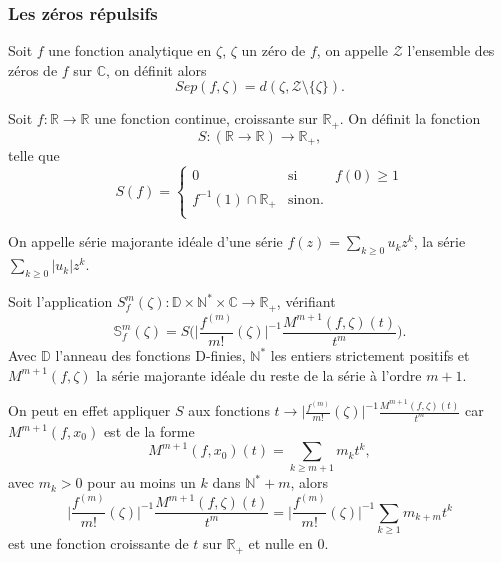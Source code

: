 \documentclass[a4paper,10pt]{article}
\begin{document}
	\subsubsection{Les zéros répulsifs}
	
	\begin{definition}
		Soit $f$ une fonction analytique en $\zeta$, $\zeta$ un zéro de $f$, on appelle $\mathcal{Z}$ l'ensemble des zéros de $f$ sur $\mathbb{C}$, on définit alors
		 \[Sep(f,\zeta)= d(\zeta, \mathcal{Z}\setminus\{\zeta\}).\]
	\end{definition}
	\begin{definition} Soit $f:\mathbb{R}\rightarrow\mathbb{R}$ une fonction continue, croissante sur $\mathbb{R}_+$. On définit la fonction \[S:(\mathbb{R} \rightarrow \mathbb{R}) \longrightarrow \mathbb{R}_+,\] 
	telle que
		\begin{equation}
		S(f)=
		\left\lbrace
		\begin{array}{ccc}
		0  & \mbox{si} & f(0) \geq 1\\
		f^{-1}(1)\cap \mathbb{R}_{+} & \mbox{sinon}.\\
		\end{array}\right.
		\end{equation}
	\end{definition}
	\begin{definition}
		On appelle série majorante idéale d'une série $f(z)=\sum_{k\geq0}u_kz^k$, la série $\sum_{k\geq0}|u_k|z^k$.
		\label{maj_ideal}
	\end{definition}
	\begin{definition}
		Soit l'application $S_{f}^{m}(\zeta) : \mathbb{D}\times \mathbb{N}^* \times \mathbb{C} \rightarrow \mathbb{R}_+$, vérifiant
		\[\mathbb{S}_{f}^{m}(\zeta)=S\Big(\Big|\frac{f^{(m)}}{m!}(\zeta)\Big|^{-1}\frac{M^{m+1}(f,\zeta)(t)}{t^{m}}\Big).\]
		Avec $\mathbb{D}$ l'anneau des fonctions D-finies, $\mathbb{N}^{*}$ les entiers strictement positifs et $M^{m+1}(f,\zeta)$ la série majorante idéale du reste de la série à l'ordre $m+1$.
	\end{definition}
	\vspace{7mm}
	\noindent On peut en effet appliquer $S$ aux fonctions $t \rightarrow \Big|\frac{f^{(m)}}{m!}(\zeta)\Big|^{-1}\frac{M^{m+1}(f,\zeta)(t)}{t^{m}}$ car $M^{m+1}(f,x_0)$ est de la forme
	\[M^{m+1}(f,x_0)(t)=\sum_{k \geq m+1} m_k t^k,\]
	avec $m_k >0$ pour au moins un $k$ dans $\mathbb{N}^{*}+m$, alors
	\[\Big|\frac{f^{(m)}}{m!}(\zeta)\Big|^{-1}\frac{M^{m+1}(f,\zeta)(t)}{t^{m}}=\Big|\frac{f^{(m)}}{m!}(\zeta)\Big|^{-1}\sum_{k \geq 1} m_{k+m} t^k\]
	est une fonction croissante de $t$ sur $\mathbb{R}_+$ et nulle en 0.
	\vspace{7mm}
	
\end{document}
